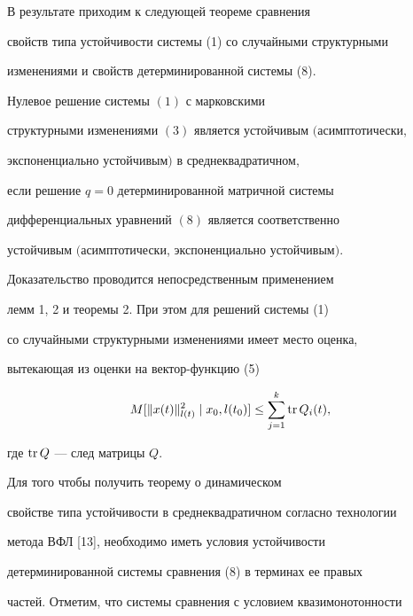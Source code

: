  


В результате приходим к следующей теореме сравнения 


свойств типа устойчивости системы (1) со случайными структурными 


изменениями и свойств детерминированной системы (8). 


 


\begin{thm} 


Нулевое решение системы $(1)$ с марковскими 


структурными изменениями $(3)$ является устойчивым $($асимптотически, 


экспоненциально устойчивым$)$ в среднеквадратичном, 


если решение $q=0$ детерминированной матричной системы 


дифференциальных уравнений $(8)$ является соответственно  


устойчивым $($асимптотически, экспоненциально устойчивым$)$. 


\end{thm} 


 


Доказательство проводится непосредственным применением  


лемм 1, 2 и теоремы 2. При этом для решений системы (1)  


со случайными структурными изменениями имеет место оценка,  


вытекающая из оценки на вектор-функцию (5) 


$$ 


M[\|x(t)\|^2_{l(t)}\mid x_0,l(t_0)]\le 


\sum^k_{j=1}\tr Q_i(t), 


$$ 


где $\operatorname{tr} Q$ --- след матрицы $Q$.  


 


Для того чтобы получить теорему о динамическом 


свойстве типа устойчивости в среднеквадратичном согласно технологии 


метода ВФЛ [13], необходимо иметь условия устойчивости  


детерминированной системы сравнения (8) в терминах ее правых  


частей. Отметим, что системы сравнения с условием квазимонотонности 


